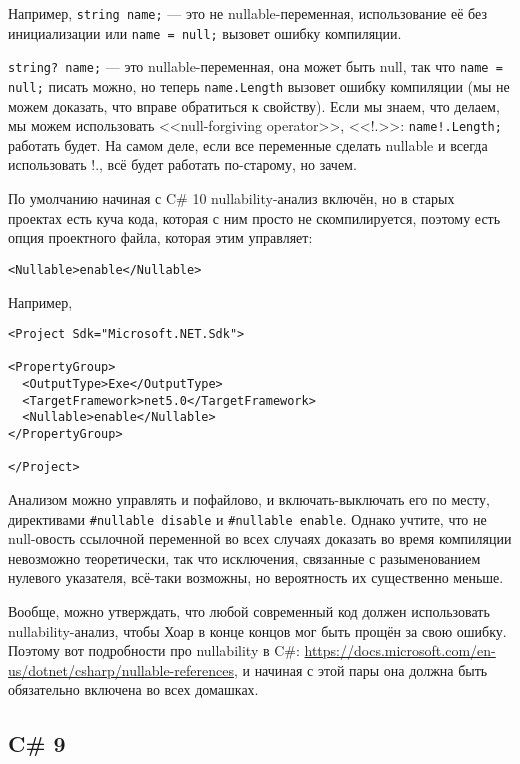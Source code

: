 \documentclass[a5paper]{article}
\begin{document}
Например, \texttt{string name;} --- это не nullable-переменная, использование её без инициализации или \texttt{name = null;} вызовет ошибку компиляции. 

\texttt{string? name;} --- это nullable-переменная, она может быть null, так что \texttt{name = null;} писать можно, но теперь \texttt{name.Length} вызовет ошибку компиляции (мы не можем доказать, что вправе обратиться к свойству). Если мы знаем, что делаем, мы можем использовать <<null-forgiving operator>>, <<!.>>: \texttt{name!.Length;} работать будет. На самом деле, если все переменные сделать nullable и всегда использовать !., всё будет работать по-старому, но зачем.

По умолчанию начиная с C\# 10 nullability-анализ включён, но в старых проектах есть куча кода, которая с ним просто не скомпилируется, поэтому есть опция проектного файла, которая этим управляет:

\begin{verbatim}
<Nullable>enable</Nullable>
\end{verbatim}

Например,

\begin{verbatim}
<Project Sdk="Microsoft.NET.Sdk">

<PropertyGroup>
  <OutputType>Exe</OutputType>
  <TargetFramework>net5.0</TargetFramework>
  <Nullable>enable</Nullable>
</PropertyGroup>

</Project>
\end{verbatim}

Анализом можно управлять и пофайлово, и включать-выключать его по месту, директивами \texttt{#nullable disable} и \texttt{#nullable enable}. Однако учтите, что не null-овость ссылочной переменной во всех случаях доказать во время компиляции невозможно теоретически, так что исключения, связанные с разыменованием нулевого указателя, всё-таки возможны, но вероятность их существенно меньше.

Вообще, можно утверждать, что любой современный код должен использовать nullability-анализ, чтобы Хоар в конце концов мог быть прощён за свою ошибку. Поэтому вот подробности про nullability в C\#: \url{https://docs.microsoft.com/en-us/dotnet/csharp/nullable-references}, и начиная с этой пары она должна быть обязательно включена во всех домашках.

\subsection{C\# 9}
\end{document}
